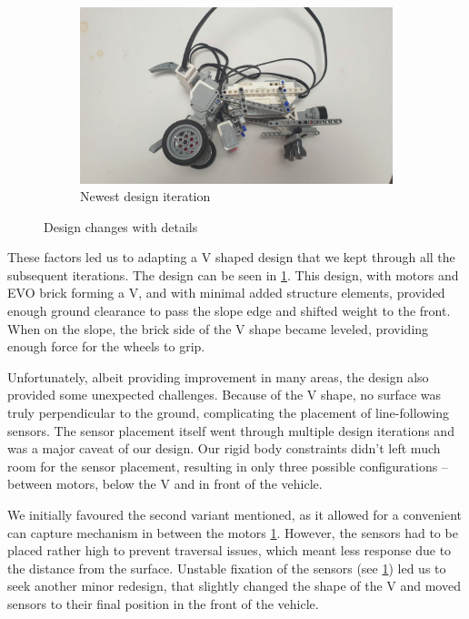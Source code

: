 \documentclass{article}
\begin{document}
\begin{figure}[!htbp]
	\vspace{\baselineskip}

	\begin{subfigure}{0.8\textwidth}
		\includegraphics[width=\textwidth]{./figures/new-prototype.jpeg}
		\caption{Newest design iteration}
	\end{subfigure}

	\caption{Design changes with details}
	\label{fig:designChanges}

\end{figure}

\newpage

These factors led us to adapting a V shaped design that we kept through all the subsequent iterations. The design can
be seen in \ref{fig:designChanges}. This design, with motors and EVO brick forming a V, and with minimal added
structure elements, provided enough ground clearance to pass the slope edge and shifted weight to the front. When on
the slope, the brick side of the V shape became leveled, providing enough force for the wheels to grip.

Unfortunately, albeit providing improvement in many areas, the design also provided some unexpected challenges.
Because of the V shape, no surface was truly perpendicular to the ground, complicating the placement of line-following
sensors. The sensor placement itself went through multiple design iterations and was a major caveat of our design.
Our rigid body constraints didn't left much room for the sensor placement, resulting in only three possible
configurations -- between motors, below the V and in front of the vehicle.

We initially favoured the second variant mentioned, as it allowed for a convenient can capture mechanism in between
the motors \ref{fig:designChanges}. However, the sensors had to be placed rather high to prevent traversal issues, which
meant less response due to the distance from the surface. Unstable fixation of the sensors (see \ref{fig:designChanges})
led us to seek another minor redesign, that slightly changed the shape of the V and moved sensors to their final position
in the front of the vehicle.
\end{document}
